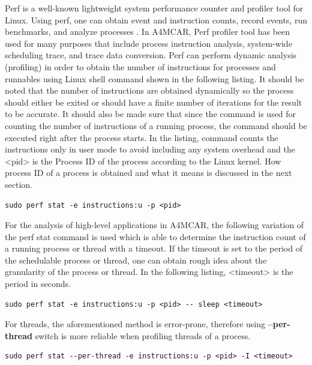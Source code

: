 Perf \cite{perf1} \cite{perf2} is a well-known lightweight system performance counter and profiler tool for Linux. Using perf, one can obtain event and instruction counts, record events, run benchmarks, and analyze processes \cite{perf1}. In A4MCAR, Perf profiler tool has been used for many purposes that include process instruction analysis, system-wide scheduling trace, and trace data conversion. Perf can perform dynamic analysis (profiling) in order to obtain the number of instructions for processes and runnables using Linux shell command shown in the following listing. It should be noted that the number of instructions are obtained dynamically so the process should either be exited or should have a finite number of iterations for the result to be accurate. It should also be made sure that since the command is used for counting the number of instructions of a running process, the command should be executed right after the process starts. In the listing, command counts the instructions only in user mode to avoid including any system overhead and the <pid> is the Process ID of the process according to the Linux kernel. How process ID of a process is obtained and what it means is discussed in the next section.
\begin{lstlisting}[style=bash]
sudo perf stat -e instructions:u -p <pid>
\end{lstlisting}
For the analysis of high-level applications in A4MCAR, the following variation of the perf stat command is used which is able to determine the instruction count of a running process or thread with a timeout. If the timeout is set to the period of the schedulable process or thread, one can obtain rough idea about the granularity of the process or thread. In the following listing, <timeout> is the period in seconds.
\begin{lstlisting}[style=bash]
sudo perf stat -e instructions:u -p <pid> -- sleep <timeout>
\end{lstlisting}
For threads, the aforementioned method is error-prone, therefore using \textbf{--per-thread} switch is more reliable when profiling threads of a process.
\begin{lstlisting}[style=bash]
sudo perf stat --per-thread -e instructions:u -p <pid> -I <timeout>
\end{lstlisting}

